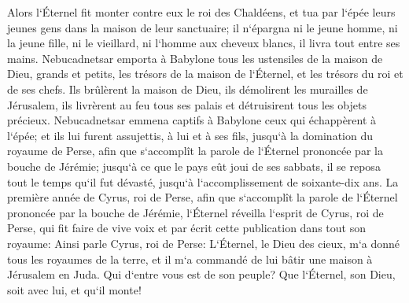 \verse Alors l`Éternel fit monter contre eux le roi des Chaldéens, et tua par l`épée leurs jeunes gens dans la maison de leur sanctuaire; il n`épargna ni le jeune homme, ni la jeune fille, ni le vieillard, ni l`homme aux cheveux blancs, il livra tout entre ses mains. 
\verse Nebucadnetsar emporta à Babylone tous les ustensiles de la maison de Dieu, grands et petits, les trésors de la maison de l`Éternel, et les trésors du roi et de ses chefs. 
\verse Ils brûlèrent la maison de Dieu, ils démolirent les murailles de Jérusalem, ils livrèrent au feu tous ses palais et détruisirent tous les objets précieux. 
\verse Nebucadnetsar emmena captifs à Babylone ceux qui échappèrent à l`épée; et ils lui furent assujettis, à lui et à ses fils, jusqu`à la domination du royaume de Perse, 
\verse afin que s`accomplît la parole de l`Éternel prononcée par la bouche de Jérémie; jusqu`à ce que le pays eût joui de ses sabbats, il se reposa tout le temps qu`il fut dévasté, jusqu`à l`accomplissement de soixante-dix ans. 
\verse La première année de Cyrus, roi de Perse, afin que s`accomplît la parole de l`Éternel prononcée par la bouche de Jérémie, l`Éternel réveilla l`esprit de Cyrus, roi de Perse, qui fit faire de vive voix et par écrit cette publication dans tout son royaume: 
\verse Ainsi parle Cyrus, roi de Perse: L`Éternel, le Dieu des cieux, m`a donné tous les royaumes de la terre, et il m`a commandé de lui bâtir une maison à Jérusalem en Juda. Qui d`entre vous est de son peuple? Que l`Éternel, son Dieu, soit avec lui, et qu`il monte! 
